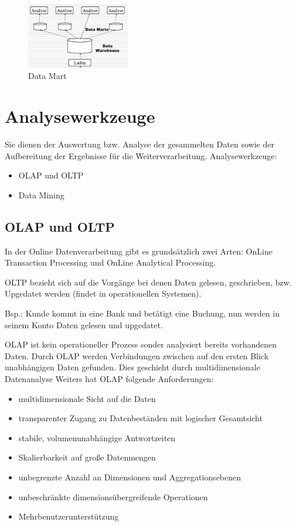 \begin{figure}[H]
    \centering
    \includegraphics[width=0.4\textwidth]{Content/images/dwh/mart.png}
    \caption{Data Mart}
    \label{fig:dwh:mart}
\end{figure}

\section{Analysewerkzeuge}

Sie dienen der Auswertung bzw. Analyse der gesammelten Daten sowie der Aufbereitung der Ergebnisse für die Weiterverarbeitung.
Analysewerkzeuge:
\begin{itemize}
    \item OLAP und OLTP
    \item Data Mining
\end{itemize}

\subsection{OLAP und OLTP}

In der Online Datenverarbeitung gibt es grundsätzlich zwei Arten: OnLine Transaction Processing und OnLine Analytical Processing.

OLTP bezieht sich auf die Vorgänge bei denen Daten gelesen, geschrieben, bzw. Upgedatet werden (findet in operationellen Systemen).

Bsp.:
Kunde kommt in eine Bank und betätigt eine Buchung, nun werden in seinem Konto Daten gelesen und upgedatet.

OLAP ist kein operationeller Prozess sonder analysiert bereits vorhandenen Daten.
Durch OLAP werden Verbindungen zwischen auf den ersten Blick unabhängigen Daten gefunden. Dies geschieht durch multidimensionale Datenanalyse
Weiters hat OLAP folgende Anforderungen:
\begin{itemize}
    \item multidimensionale Sicht auf die Daten
    \item transparenter Zugang zu Datenbeständen mit logischer Gesamtsicht
    \item stabile, volumenunabhängige Antwortzeiten
    \item Skalierbarkeit auf große Datenmengen
    \item unbegrenzte Anzahl an Dimensionen und Aggregationsebenen
    \item unbeschränkte dimensionsübergreifende Operationen
    \item Mehrbenutzerunterstützung
\end{itemize}

